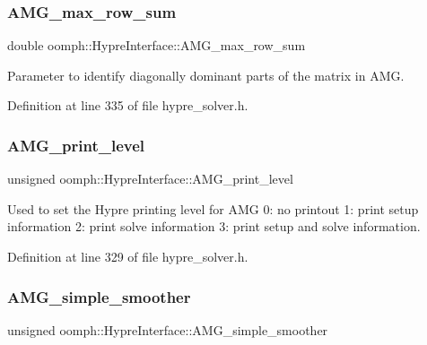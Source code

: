 \subsubsection{\texorpdfstring{A\+M\+G\+\_\+max\+\_\+row\+\_\+sum}{AMG\_max\_row\_sum}}
{\footnotesize\ttfamily double oomph\+::\+Hypre\+Interface\+::\+A\+M\+G\+\_\+max\+\_\+row\+\_\+sum\hspace{0.3cm}{\ttfamily [protected]}}



Parameter to identify diagonally dominant parts of the matrix in A\+MG. 



Definition at line 335 of file hypre\+\_\+solver.\+h.

\mbox{\label{classoomph_1_1HypreInterface_ad1e2b0066abfccd0c489227c208c0f74}} 
\subsubsection{\texorpdfstring{A\+M\+G\+\_\+print\+\_\+level}{AMG\_print\_level}}
{\footnotesize\ttfamily unsigned oomph\+::\+Hypre\+Interface\+::\+A\+M\+G\+\_\+print\+\_\+level\hspace{0.3cm}{\ttfamily [protected]}}



Used to set the Hypre printing level for A\+MG 0\+: no printout 1\+: print setup information 2\+: print solve information 3\+: print setup and solve information. 



Definition at line 329 of file hypre\+\_\+solver.\+h.

\mbox{\label{classoomph_1_1HypreInterface_ac2671434b9202b17d9ecff0a7787f83c}} 
\subsubsection{\texorpdfstring{A\+M\+G\+\_\+simple\+\_\+smoother}{AMG\_simple\_smoother}}
{\footnotesize\ttfamily unsigned oomph\+::\+Hypre\+Interface\+::\+A\+M\+G\+\_\+simple\+\_\+smoother\hspace{0.3cm}{\ttfamily [protected]}}



